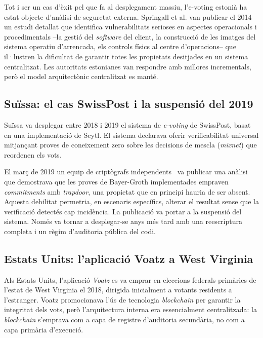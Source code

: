 Tot i ser un cas d'èxit pel que fa al desplegament massiu, l'e-voting estonià ha estat objecte d'anàlisi de seguretat
externa.
Springall et al. \cite{springall2014estonia} van publicar el 2014 un estudi detallat que identifica vulnerabilitats
serioses en aspectes operacionals i procedimentals --la gestió del \textit{software} del client, la construcció de les imatges
del sistema operatiu d'arrencada, els controls físics al centre d'operacions-- que il·lustren la dificultat de garantir
totes les propietats desitjades en un sistema centralitzat.
Les autoritats estonianes van respondre amb millores incrementals, però el model arquitectònic centralitzat es manté.

\subsection{Suïssa: el cas SwissPost i la suspensió del 2019}
\label{subsec:suissa:-el-cas-swisspost-i-la-suspensio-del-2019}

Suïssa va desplegar entre 2018 i 2019 el sistema de \emph{e-voting} de SwissPost, basat en una implementació de Scytl.
El sistema declarava oferir verificabilitat universal mitjançant proves de coneixement zero sobre les decisions de
mescla (\emph{mixnet}) que reordenen els vots.

El març de 2019 un equip de criptògrafs independents~\cite{lewis2019swisspost} va publicar una anàlisi que demostrava
que les proves de Bayer-Groth implementades empraven \emph{commitments} amb \emph{trapdoor}, una propietat que en
principi hauria de ser absent.
Aquesta debilitat permetria, en escenaris específics, alterar el resultat sense que la verificació detectés cap
incidència.
La publicació va portar a la suspensió del sistema.
Només va tornar a desplegar-se anys més tard amb una reescriptura completa i un règim d'auditoria pública del codi.

\subsection{Estats Units: l'aplicació Voatz a West Virginia}
\label{subsec:estats-units:-l'aplicacio-voatz-a-west-virginia}

Als Estats Units, l'aplicació \emph{Voatz} es va emprar en eleccions federals primàries de l'estat de West Virginia el
2018, dirigida inicialment a votants residents a l'estranger.
Voatz promocionava l'ús de tecnologia \emph{blockchain} per garantir la integritat dels vots, però l'arquitectura
interna era essencialment centralitzada: la \emph{blockchain} s'emprava com a capa de registre d'auditoria secundària,
no com a capa primària d'execució.

